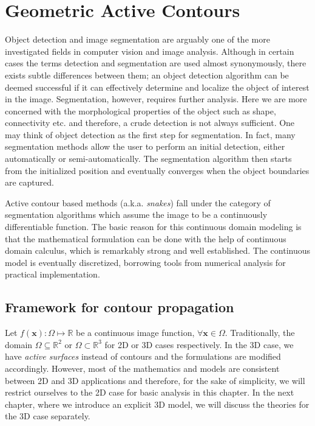 
\chapter{Geometric Active Contours} %

\label{Chapter3} %



Object detection and image segmentation are arguably one of the more investigated fields in computer vision and image analysis. Although in certain cases the terms detection and segmentation are used almost synonymously, there exists subtle differences between them; an object detection algorithm can be deemed successful if it can effectively determine and localize the object of interest in the image. Segmentation, however, requires further analysis. Here we are more concerned with the morphological properties of the object such as shape, connectivity etc. and therefore, a crude detection is not always sufficient. One may think of object detection as the first step for segmentation. In fact, many segmentation methods allow the user to perform an initial detection, either automatically or semi-automatically. The segmentation algorithm then starts from the initialized position and eventually converges when the object boundaries are captured.

Active contour based methods (a.k.a. \textit{snakes}) fall under the category of segmentation algorithms which assume the image to be a  continuously differentiable function. The basic reason for this continuous domain modeling is that the mathematical formulation can be done with the help of continuous domain calculus, which is remarkably strong and well established. The continuous model is eventually discretized, borrowing tools from numerical analysis for practical implementation.

\section{Framework for contour propagation}

Let $f(\textbf{x}):\Omega\mapsto\mathbb{R}$ be a continuous image function, $\forall\textbf{x}\in\Omega$. Traditionally, the domain $\Omega\subseteq\mathbb{R}^2$ or  $\Omega\subset\mathbb{R}^3$ for 2D or 3D cases respectively. In the 3D case, we have \textit{active surfaces} instead of contours and the formulations are modified accordingly. However, most of the mathematics and models are consistent between 2D and 3D applications and therefore, for the sake of simplicity, we will restrict ourselves to the 2D case for basic analysis in this chapter. In the next chapter, where we introduce an explicit 3D model, we will discuss the theories for the 3D case separately.

